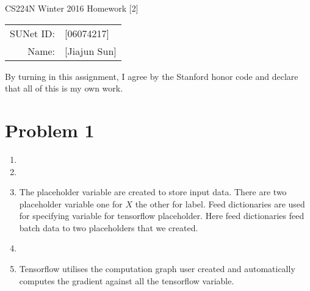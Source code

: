 \documentclass[10pt]{article}
\begin{document}
\begin{center}
{\Large CS224N Winter 2016 Homework [2]}

\begin{tabular}{rl}
SUNet ID: & [06074217] \\
Name: & [Jiajun Sun] \\
\end{tabular}
\end{center}

By turning in this assignment, I agree by the Stanford honor code and declare
that all of this is my own work.

\section*{Problem 1}
\begin{enumerate}[label=(\alph*)]
\item
\item
\item
The placeholder variable are created to store input data. There are two placeholder variable one for $X$ the other for label.
Feed dictionaries are used for specifying variable for tensorflow placeholder.
Here feed dictionaries feed batch data to two placeholders that we created.
\item
\item
Tensorflow utilises the computation graph user created and automatically computes the gradient against all the tensorflow variable.

\end{enumerate}

\pagebreak[4]
\end{document}
